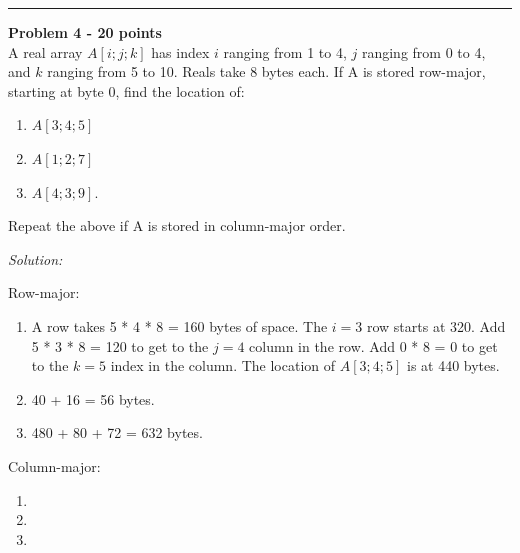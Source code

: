 \documentclass[a4paper, 11pt]{article}
\newenvironment{problem}[2][Problem]
    { \begin{mdframed}[backgroundcolor=gray!20] \textbf{#1 #2} \\}
    {  \end{mdframed}}
\newenvironment{solution}
    {\textit{Solution:}}
    {}
\begin{document}
\noindent\rule{7in}{2.8pt}

\begin{problem}{4 - 20 points}
A real array $A [i; j; k]$ has index $i$ ranging from 1 to 4, $j$  ranging from 0 to 4, and $k$ ranging from 5 to 10. Reals take 8 bytes each. If A  is stored row-major, starting at byte 0, find the location of:  

\begin{enumerate}[a]
    \item $A [3; 4 ; 5]$
    \item $A [1; 2 ; 7]$
    \item $A [4; 3 ; 9].$
\end{enumerate} 
Repeat the above if A is stored in column-major order.

\end{problem}

\begin{solution}

\noindent Row-major:
\begin{enumerate}[a]
    \item A row takes 5 * 4 * 8 = 160 bytes of space. The $i=3$ row starts at 320. Add 5 * 3 * 8 = 120 to get to the $j=4$ column in the row. Add 0 * 8 = 0 to get to the $k=5$ index in the column. The location of $A[3;4;5]$ is at 440 bytes.
    \item 40 + 16 = 56 bytes.
    \item 480 + 80 + 72 = 632 bytes.
\end{enumerate} 
Column-major:
\begin{enumerate}[a]
    \item 
    \item 
    \item 
\end{enumerate} 

\end{solution} 

\end{document}
